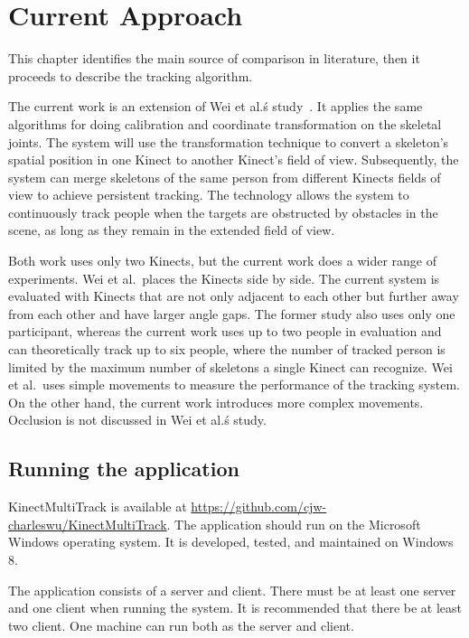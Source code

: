 


\chapter{Current Approach}

\label{chapter:current_appraoch}

This chapter identifies the main source of comparison in literature, then it proceeds to describe the tracking algorithm.

The current work is an extension of Wei et al.\'s study~\cite{wei_kinect_calibration}. It applies the same algorithms for doing calibration and coordinate transformation on the skeletal joints. The system will use the transformation technique to convert a skeleton's spatial position in one Kinect to another Kinect's field of view. Subsequently, the system can merge skeletons of the same person from different Kinects fields of view to achieve persistent tracking. The technology allows the system to continuously track people when the targets are obstructed by obstacles in the scene, as long as they remain in the extended field of view. 

Both work uses only two Kinects, but the current work does a wider range of experiments. Wei et al.\ places the Kinects side by side. The current system is evaluated with Kinects that are not only adjacent to each other but further away from each other and have larger angle gaps. The former study also uses only one participant, whereas the current work uses up to two people in evaluation and can theoretically track up to six people, where the number of tracked person is limited by the maximum number of skeletons a single Kinect can recognize. Wei et al.\ uses simple movements to measure the performance of the tracking system. On the other hand, the current work introduces more complex movements. Occlusion is not discussed in Wei et al.\'s study.

\section{Running the application}
\label{sec:current_approach_running_application}

KinectMultiTrack is available at \url{https://github.com/cjw-charleswu/KinectMultiTrack}. The application should run on the Microsoft Windows operating system. It is developed, tested, and maintained on Windows 8.

The application consists of a server and client. There must be at least one server and one client when running the system. It is recommended that there be at least two client. One machine can run both as the server and client.

